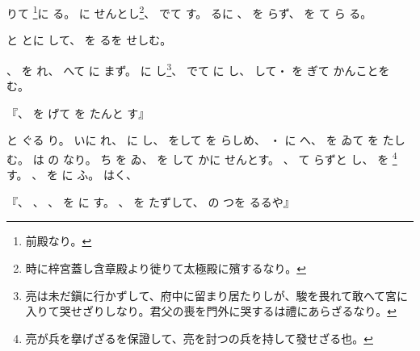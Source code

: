 \documentclass[a4paper,12pt]{article}
\begin{document}
%
%
りて%
\footnote{前殿なり。}に%
る。%
%
に%
せんとし\footnote{時に梓宮蓋し含章殿より徙りて太極殿に殯するなり。}、%
%
でて%
す。%
るに%
、%
を%
らず、%
%
を%
て%
ら%
る。%

%
と%
%
とに%
して、%
を%
るを%
せしむ。%

%
%
、%
を%
れ、%
へて%
%
に%
まず。%
に%
し\footnote{亮は未だ鎭に行かずして、府中に留まり居たりしが、駿を畏れて敢へて宮に入りて哭せざりしなり。君父の喪を門外に哭するは禮にあらざるなり。}、%
でて%
に%
し、%
して・%
を%
ぎて%
%
かんことを%
む。%
\begin{quoting}
『、%
を%
げて%
を%
たんと%
す』
\end{quoting}と%
ぐる%
%
り。%
%
いに%
れ、%
に%
し、%
をして%
を%
らしめ、%
・%
に%
へ、%
を%
ゐて%
を%
たしむ。%
は%
の%
なり。%
ち%
を%
ゐ、%
を%
して%
かに%
せんとす。%
、%
て%
らずと%
し、%
を%
\footnote{亮が兵を擧げざるを保證して、亮を討つの兵を持して發せざる也。}す。%
、%
を%
%
に%
ふ。%
%
はく、%
\begin{quoting}
『、%
、%
、%
を%
に%
す。%
、%
%
を%
たずして、%
の%
つを%
るるや』
\end{quoting}
\end{document}
